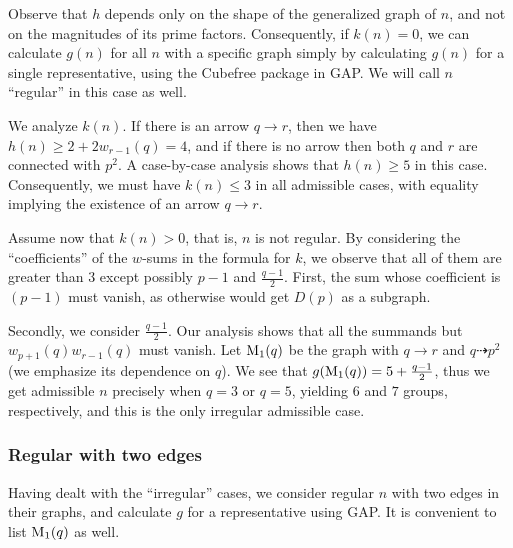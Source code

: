Observe that $h$ depends only on the shape of the generalized graph of $n$, and not on the magnitudes of its prime factors.
Consequently, if $k(n) = 0$, we can calculate $g(n)$ for all $n$ with a specific graph simply by calculating $g(n)$ for a single representative,
using the Cubefree package in GAP{\cite{GAP4, cubefreepkg}}.
We will call $n$ ``regular'' in this case as well.

We analyze $k(n)$.
If there is an arrow $q \to r$, then we have $h(n) \ge 2 + 2w_{r - 1}(q) = 4$, and if there is no arrow then both $q$ and $r$ are connected with $p^2$.
A case-by-case analysis shows that $h(n) \ge 5$ in this case.
Consequently, we must have $k(n) \le 3$ in all admissible cases, with equality implying the existence of an arrow $q \to r$.

Assume now that $k(n) > 0$, that is, $n$ is not regular.
By considering the ``coefficients'' of the $w$-sums in the formula for $k$, we observe that all of them are greater than $3$ except possibly $p - 1$ and $\frac{q - 1}{2}$.
First, the sum whose coefficient is $(p - 1)$ must vanish, as otherwise would get $D(p)$ as a subgraph.

Secondly, we consider $\frac{q - 1}{2}$.
Our analysis shows that all the summands but $w_{p + 1}(q)w_{r - 1}(q)$ must vanish.
Let $\text{M}_{1}(q)$ be the graph with $q \to r$ and $q \dashrightarrow p^2$ (we emphasize its dependence on $q$).
We see that $g(\text{M}_{1}(q)) = 5 + \frac{q - 1}{2}$, thus we get admissible $n$ precisely when $q = 3$ or $q = 5$, yielding $6$ and $7$ groups,
respectively, and this is the only irregular admissible case.

\subsubsection*{Regular  with two edges}
Having dealt with the ``irregular'' cases, we consider regular $n$ with two edges in their graphs, and calculate $g$ for a representative using GAP.
It is convenient to list $\text{M}_{1}(q)$ as well.
\vspace*{-\baselineskip}


